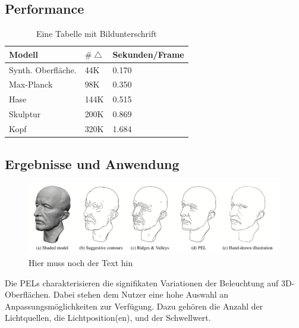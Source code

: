 \documentclass{paperStyle}
\begin{document}
\subsection{Performance}
\begin{table}[htb]

\begin{tabular}{|l|ll|}
\hline
Modell & $\#\bigtriangleup$ & Sekunden/Frame\\
\hline
Synth. Oberfläche. & 44K & 0.170 \\
Max-Planck & 98K & 0.350 \\
Hase & 144K & 0.515 \\
Skulptur & 200K & 0.869 \\
Kopf & 320K & 1.684 \\

\hline
\end{tabular}
\caption{Eine Tabelle mit Bildunterschrift }
\label{tab:TableExample}
\end{table}

\subsection{Ergebnisse und Anwendung}
\begin{figure}
	\centering
		\includegraphics[width=0.7\linewidth]{anwpel.png}
	\caption{Hier muss noch der Text hin}
\end{figure}

Die PELs charakterisieren die signifikaten Variationen der Beleuchtung auf 3D-Oberflächen. Dabei stehen dem Nutzer eine hohe Auswahl an Anpassungsmöglichkeiten zur Verfügung. Dazu gehören die Anzahl der Lichtquellen,  die Lichtposition(en), und der Schwellwert.
\end{document}

